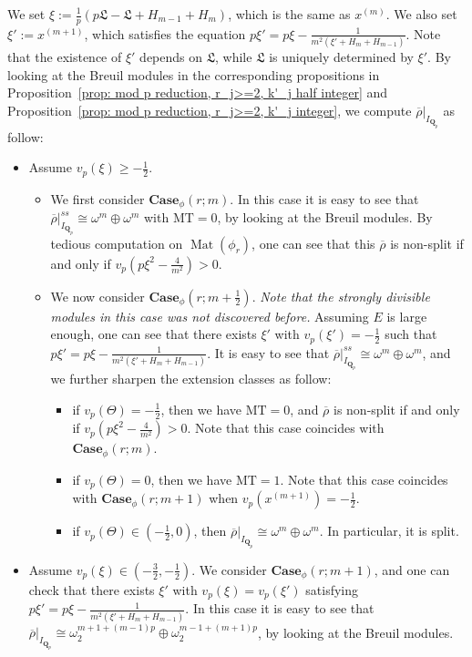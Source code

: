\documentclass[11pt]{amsart}
\theoremstyle{definition}
\numberwithin{equation}{subsection}
\theoremstyle{plain}
\theoremstyle{plain}
\theoremstyle{plain}
\theoremstyle{plain}
\theoremstyle{plain}
\theoremstyle{plain}
\theoremstyle{plain}
\theoremstyle{plain}
\theoremstyle{plain}
\theoremstyle{plain}
\theoremstyle{plain}
\theoremstyle{plain}
\theoremstyle{definition}
\theoremstyle{definition}
\theoremstyle{definition}
\theoremstyle{remark}
\renewcommand{\(}{\textup{(}}
\renewcommand{\)}{\textup{)}}
\DeclareMathOperator{\Mat}{Mat}
\newcommand{\Qp}{\mathbf{Q}_p}
\newcommand{\rhobar}{\overline{\rho}}
\newcommand{\fL}{\mathfrak{L}}
\begin{document}
We set $\xi:=\frac{1}{p}(p\fL-\fL+H_{m-1}+H_m)$, which is the same as $x^{(m)}$. We also set $\xi':=x^{(m+1)}$, which satisfies the equation $p\xi'=p\xi-\frac{1}{m^2(\xi'+H_m+H_{m-1})}$. Note that the existence of $\xi'$ depends on $\fL$, while $\fL$ is uniquely determined by $\xi'$. By looking at the Breuil modules in the corresponding propositions in Proposition~\ref{prop: mod p reduction, r_j>=2, k'_j half integer} and Proposition~\ref{prop: mod p reduction, r_j>=2, k'_j integer}, we compute $\rhobar|_{I_{\Qp}}$ as follow:
\begin{itemize}[leftmargin=*]
\item Assume $v_p(\xi)\geq -\frac{1}{2}$.
\begin{itemize}[leftmargin=*]
    \item We first consider $\mathbf{Case}_\phi(r;m)$. In this case it is easy to see that $\rhobar|_{I_{\Qp}}^{ss}\cong \omega^m\oplus\omega^m$ with $\mathrm{MT}=0$, by looking at the Breuil modules. By tedious computation on $\Mat(\phi_r)$, one can see that this $\rhobar$ is non-split if and only if $v_p(p\xi^2-\frac{4}{m^2})>0$.
    \item We now consider $\mathbf{Case}_\phi(r;m+\frac{1}{2})$. \emph{Note that the strongly divisible modules in this case was not discovered before.} Assuming $E$ is large enough, one can see that there exists $\xi'$ with $v_p(\xi')=-
    \frac{1}{2}$ such that $p\xi'=p\xi-\frac{1}{m^2(\xi'+H_m+H_{m-1})}$. It is easy to see that $\rhobar|_{I_{\Qp}}^{ss}\cong\omega^m\oplus\omega^m$, and we further sharpen the extension classes as follow:
    \begin{itemize}[leftmargin=*]
        \item if $v_p(\Theta)=-\frac{1}{2}$, then we have $\mathrm{MT}=0$, and $\rhobar$ is non-split if and only if $v_p(p\xi^2-\frac{4}{m^2})>0$. Note that this case coincides with $\mathbf{Case}_\phi(r;m)$.
        \item if $v_p(\Theta)=0$, then we have $\mathrm{MT}=1$. Note that this case coincides with $\mathbf{Case}_\phi(r;m+1)$ when $v_p(x^{(m+1)})=-\frac{1}{2}$.
        \item if $v_p(\Theta)\in(-\frac{1}{2},0)$, then $\rhobar|_{I_{\Qp}}\cong\omega^m\oplus\omega^m$. In particular, it is split.
    \end{itemize}
\end{itemize}
\item Assume $v_p(\xi)\in(-\frac{3}{2},-\frac{1}{2})$. We consider $\mathbf{Case}_\phi(r;m+1)$, and one can check that there exists $\xi'$ with $v_p(\xi)=v_p(\xi')$ satisfying $p\xi'=p\xi-\frac{1}{m^2(\xi'+H_m+H_{m-1})}$. In this case it is easy to see that $\rhobar|_{I_{\Qp}}\cong\omega_2^{m+1+(m-1)p}\oplus\omega_2^{m-1+(m+1)p}$, by looking at the Breuil modules.

\end{itemize}
\end{document}
